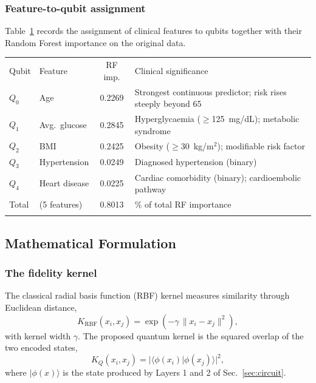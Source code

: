 \documentclass{ws-ijqi}
\begin{document}
\subsubsection{Feature-to-qubit assignment}

Table~\ref{tab:qubit} records the assignment of clinical features to qubits
together with their Random Forest importance on the original data.

\begin{table}[htb]
{\fontsize{8}{10}\selectfont
\begin{tabular}{@{}llc>{\raggedright\arraybackslash}p{1.75in}@{}}
\toprule
Qubit & Feature & RF imp. & Clinical significance \\
\colrule
$Q_0$ & Age & 0.2269 & Strongest continuous predictor; risk rises
                       steeply beyond 65 \\
$Q_1$ & Avg.\ glucose & 0.2845 & Hyperglycaemia ($\geq$125~mg/dL);
                       metabolic syndrome \\
$Q_2$ & BMI & 0.2425 & Obesity ($\geq$30~kg/m$^2$); modifiable
                       risk factor \\
$Q_3$ & Hypertension & 0.0249 & Diagnosed hypertension (binary) \\
$Q_4$ & Heart disease & 0.0225 & Cardiac comorbidity (binary);
                       cardioembolic pathway \\
\colrule
Total & (5 features) & 0.8013 & 80.1\% of total RF importance \\
\botrule
\end{tabular}}
\label{tab:qubit}
\end{table}

\subsection{Mathematical Formulation}
\label{sec:math}

\subsubsection{The fidelity kernel}

The classical radial basis function (RBF) kernel measures similarity through
Euclidean distance,
\begin{equation}
K_{\mathrm{RBF}}(x_i,x_j) = \exp\!\left(-\gamma\,\|x_i-x_j\|^2\right),
\label{eq:rbf}
\end{equation}
with kernel width $\gamma$. The proposed quantum kernel is the squared overlap
of the two encoded states,
\begin{equation}
K_{Q}(x_i,x_j) = \big|\langle \phi(x_i) | \phi(x_j)\rangle\big|^{2},
\label{eq:qkernel}
\end{equation}
where $|\phi(x)\rangle$ is the state produced by Layers 1 and 2 of
Sec.~\ref{sec:circuit}.
\end{document}
